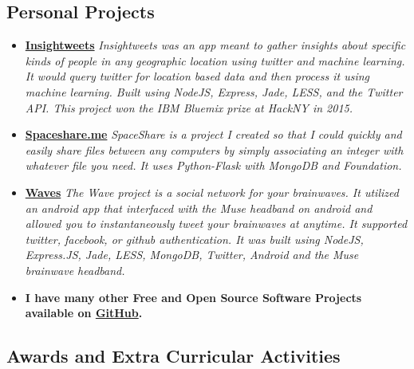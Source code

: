 \documentclass[12pt,a4paper,sans]{moderncv} %
\begin{document}
\subsection{Personal Projects}

\vspace{5pt}

\begin{itemize}

\item{\textbf{\href{http://insightweets.mybluemix.net/landing}{Insightweets}}\textit{ Insightweets was an app meant to gather insights about specific kinds of people in any geographic location using twitter and machine learning. It would query twitter for location based data and then process it using machine learning. Built using NodeJS, Express, Jade, LESS, and the Twitter API. This project won the IBM Bluemix prize at HackNY in 2015.}}

\vspace{5pt}


\item{\textbf{\href{http://spaceshare.me}{Spaceshare.me}} \textit{ SpaceShare is a project I created so that I could quickly and easily share files between any computers by simply associating an integer with whatever file you need. It uses Python-Flask with MongoDB and Foundation.}}

\vspace{5pt}

\item{\textbf{\href{https://github.com/davidawad/waves}{Waves}}\textit{ The Wave project is a social network for your brainwaves. It utilized an android app that interfaced with the Muse headband on android and allowed you to instantaneously tweet your brainwaves at anytime. It supported twitter, facebook, or github authentication. It was built using NodeJS, Express.JS, Jade, LESS, MongoDB, Twitter, Android and the Muse brainwave headband.}}

\vspace{5pt}

\item{\textbf{I have many other Free and Open Source Software Projects available on \href{https://github.com/davidawad}{GitHub}.}}

\vspace{5pt}

\end{itemize}

\subsection{Awards and Extra Curricular Activities}
\end{document}
